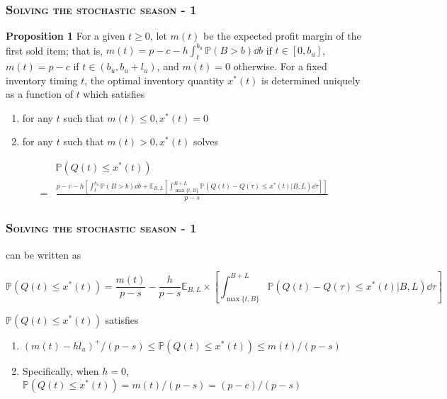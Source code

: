\documentclass[aspectratio=169]{../presentation}
\begin{document}
    \begin{frame}
        \frametitle{\textsc{Solving the stochastic season - 1}}

        \textrm{\bfseries Proposition 1} For a given $t\geq 0$, let $m(t)$  be the expected profit margin of the first sold item; that is, $m(t) = p - c - h\int_{t}^{b_u} \mathbb P(B > b)\dd b$ if $t\in [0, b_u]$, $m(t) = p - c$ if $t\in (b_u, b_u + l_u)$, and $m(t) = 0$ otherwise. For a fixed inventory timing $t$, the optimal inventory quantity $x^*(t)$ is determined uniquely as a function of $t$ which satisfies

        \begin{enumerate}
            \item for any $t$ such that $m(t) \leq 0, x^*(t) = 0$
            \pause
            \item for any $t$ such that $m(t) > 0, x^*(t)$ solves 
        \end{enumerate}

        \begin{equation}
            \begin{aligned}
                & \mathbb P(Q(t)\leq x^*(t)) \\
                =& \frac{p - c - h\left[\int_{t}^{b_u}\mathbb P(B>b)\dd b + \mathbb E_{B, L}\left[\int_{\max\{t, B\}}^{B+L} \mathbb P(Q(t) - Q(\tau) \leq x^*(t) | B, L)\dd \tau\right]\right]}{p-s}
            \end{aligned}
            \label{eq:1}
        \end{equation}

    \end{frame}

    \begin{frame}
        \frametitle{\textsc{Solving the stochastic season - 1}}

         can be written as 

        \begin{equation}
            \mathbb P(Q(t)\leq x^*(t)) = \frac{m(t)}{p-s} - \frac{h}{p-s}\mathbb E_{B, L}\times \left[\int_{\max\{t, B\}}^{B+L} \mathbb P(Q(t) - Q(\tau)\leq x^*(t) | B, L)\dd \tau\right]
            \label{eq:2}
        \end{equation}

        \pause

        $\mathbb P(Q(t)\leq x^*(t))$ satisfies

        \begin{enumerate}
            \item $(m(t) - hl_u)^+ / (p-s)\leq \mathbb P(Q(t)\leq x^*(t))\leq m(t) / (p-s)$
            \item Specifically, when $h = 0$, $\mathbb P(Q(t)\leq x^*(t)) = m(t) / (p-s) = (p-c)/(p-s)$
        \end{enumerate}

    \end{frame}
\end{document}
